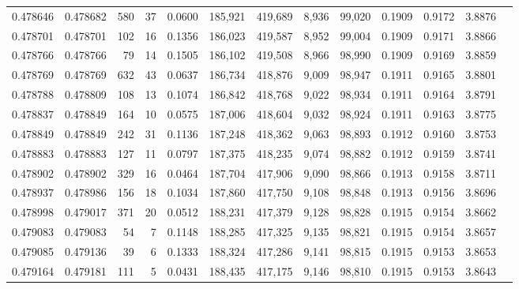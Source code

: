 \begin{tabular}{rrrrrrrrrrrrr}
0.478646 & 0.478682 &   580 &    37 &                                     0.0600 & 185,921 & 419,689 &   8,936 &  99,020 & 0.1909 & 0.9172 & 3.8876 \\
0.478701 & 0.478701 &   102 &    16 &                                     0.1356 & 186,023 & 419,587 &   8,952 &  99,004 & 0.1909 & 0.9171 & 3.8866 \\
0.478766 & 0.478766 &    79 &    14 &                                     0.1505 & 186,102 & 419,508 &   8,966 &  98,990 & 0.1909 & 0.9169 & 3.8859 \\
0.478769 & 0.478769 &   632 &    43 &                                     0.0637 & 186,734 & 418,876 &   9,009 &  98,947 & 0.1911 & 0.9165 & 3.8801 \\
0.478788 & 0.478809 &   108 &    13 &                                     0.1074 & 186,842 & 418,768 &   9,022 &  98,934 & 0.1911 & 0.9164 & 3.8791 \\
0.478837 & 0.478849 &   164 &    10 &                                     0.0575 & 187,006 & 418,604 &   9,032 &  98,924 & 0.1911 & 0.9163 & 3.8775 \\
0.478849 & 0.478849 &   242 &    31 &                                     0.1136 & 187,248 & 418,362 &   9,063 &  98,893 & 0.1912 & 0.9160 & 3.8753 \\
0.478883 & 0.478883 &   127 &    11 &                                     0.0797 & 187,375 & 418,235 &   9,074 &  98,882 & 0.1912 & 0.9159 & 3.8741 \\
0.478902 & 0.478902 &   329 &    16 &                                     0.0464 & 187,704 & 417,906 &   9,090 &  98,866 & 0.1913 & 0.9158 & 3.8711 \\
0.478937 & 0.478986 &   156 &    18 &                                     0.1034 & 187,860 & 417,750 &   9,108 &  98,848 & 0.1913 & 0.9156 & 3.8696 \\
0.478998 & 0.479017 &   371 &    20 &                                     0.0512 & 188,231 & 417,379 &   9,128 &  98,828 & 0.1915 & 0.9154 & 3.8662 \\
0.479083 & 0.479083 &    54 &     7 &                                     0.1148 & 188,285 & 417,325 &   9,135 &  98,821 & 0.1915 & 0.9154 & 3.8657 \\
0.479085 & 0.479136 &    39 &     6 &                                     0.1333 & 188,324 & 417,286 &   9,141 &  98,815 & 0.1915 & 0.9153 & 3.8653 \\
0.479164 & 0.479181 &   111 &     5 &                                     0.0431 & 188,435 & 417,175 &   9,146 &  98,810 & 0.1915 & 0.9153 & 3.8643 \\

\end{tabular}
